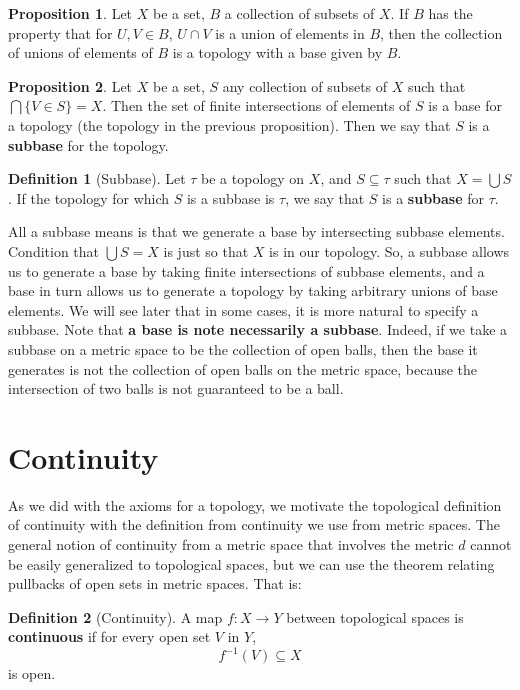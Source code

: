 \documentclass[11pt, oneside]{amsart}   	%
\theoremstyle{definition}
\newtheorem{definition}{Definition}[section]
\newtheorem{prop}{Proposition}[section]
\begin{document}
	\begin{prop}
		Let $X$ be a set, $B$ a collection of subsets of $X$. If $B$ has the property that for $U, V\in B$, $U\cap V$ is a union of elements in $B$, then the 
		collection of unions of elements of $B$ is a topology with a base given by $B$. 
	\end{prop}
	
	\begin{prop}
		Let $X$ be a set, $S$ any collection of subsets of $X$ such that $\bigcap\{V\in S\} = X$. Then the set of finite intersections of elements of $S$ is a 
		base for a topology (the topology in the previous proposition). Then we say that $S$ is a \textbf{subbase} for the topology.
	\end{prop}
	
	\begin{definition}[Subbase]
		Let $\tau$ be a topology on $X$, and $S\subseteq\tau$ such that $X = \bigcup S$. If the topology for which $S$ is a subbase is $\tau$, we say that 
		$S$ is a \textbf{subbase} for $\tau$. 
	\end{definition}
	
	All a subbase means is that we generate a base by intersecting subbase elements. Condition that $\bigcup S = X$ is just so that $X$ is in our topology. 
	So, a subbase allows us to generate a base by taking finite intersections of subbase elements, and a base in turn allows us to generate a topology by taking 
	arbitrary unions of base elements. We will see later that in some cases, it is more natural to specify a subbase. Note that \textbf{a base is note necessarily 
	a subbase}. Indeed, if we take a subbase on a metric space to be the collection of open balls, then the base it generates is not the collection of open balls 
	on the metric space, because the intersection of two balls is not guaranteed to be a ball.

\section{Continuity}

	As we did with the axioms for a topology, we motivate the topological definition of continuity with the definition from continuity we use from metric spaces. 
	The general notion of continuity from a metric space that involves the metric $d$ cannot be easily generalized to topological spaces, but we can use the 
	theorem relating pullbacks of open sets in metric spaces. That is:
	
	\begin{definition}[Continuity]
		A map $f : X\rightarrow Y$ between topological spaces is \textbf{continuous} if for every open set $V$ in $Y$, 
		$$
			f^{-1}(V)\subseteq X
		$$
		is open. 
	\end{definition}
	
\end{document}
